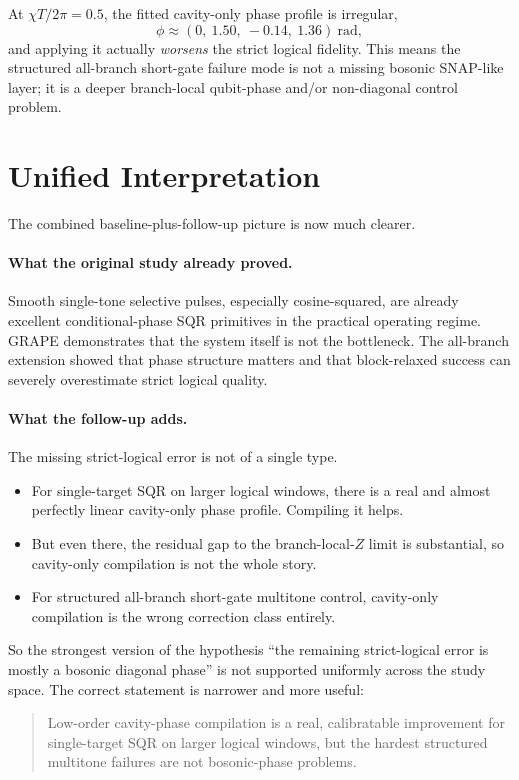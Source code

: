\documentclass[11pt]{article}
\begin{document}
At $\chi T/2\pi = 0.5$, the fitted cavity-only phase profile is irregular,
\[
\phi \approx (0,\ 1.50,\ -0.14,\ 1.36)\ \mathrm{rad},
\]
and applying it actually \emph{worsens} the strict logical fidelity. This means
the structured all-branch short-gate failure mode is not a missing bosonic
SNAP-like layer; it is a deeper branch-local qubit-phase and/or non-diagonal
control problem.

\section{Unified Interpretation}

The combined baseline-plus-follow-up picture is now much clearer.

\paragraph{What the original study already proved.}
Smooth single-tone selective pulses, especially cosine-squared, are already
excellent conditional-phase SQR primitives in the practical operating regime.
GRAPE demonstrates that the system itself is not the bottleneck. The all-branch
extension showed that phase structure matters and that block-relaxed success can
severely overestimate strict logical quality.

\paragraph{What the follow-up adds.}
The missing strict-logical error is not of a single type.
\begin{itemize}
    \item For single-target SQR on larger logical windows, there is a real and
    almost perfectly linear cavity-only phase profile. Compiling it helps.
    \item But even there, the residual gap to the branch-local-$Z$ limit is
    substantial, so cavity-only compilation is not the whole story.
    \item For structured all-branch short-gate multitone control, cavity-only
    compilation is the wrong correction class entirely.
\end{itemize}

So the strongest version of the hypothesis
``the remaining strict-logical error is mostly a bosonic diagonal phase''
is not supported uniformly across the study space. The correct statement is
narrower and more useful:
\begin{quote}
Low-order cavity-phase compilation is a real, calibratable improvement for
single-target SQR on larger logical windows, but the hardest structured
multitone failures are not bosonic-phase problems.
\end{quote}
\end{document}

